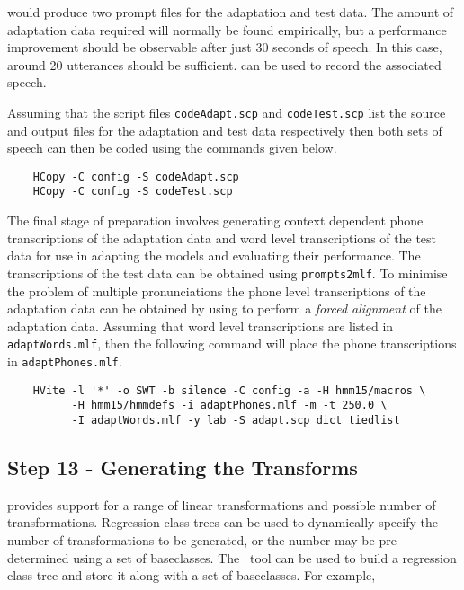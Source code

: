 \noindent
would produce two prompt files for the adaptation and test data. The amount of 
adaptation data required will normally be found empirically, but a performance 
improvement should be observable after just 30 seconds of speech.
In this case, around 20 utterances should be sufficient.
 can be used to record the associated speech.

Assuming that the script files \texttt{codeAdapt.scp} and \texttt{codeTest.scp} 
list the source and output files for the adaptation and test data respectively 
then both sets of speech can then be coded using the  commands given 
below.

\begin{verbatim}
    HCopy -C config -S codeAdapt.scp
    HCopy -C config -S codeTest.scp
\end{verbatim}

\noindent
The final stage of preparation involves generating context dependent phone 
transcriptions of the adaptation data and word level transcriptions of the test 
data for use in adapting the models and evaluating their performance.
The transcriptions of the test data can be obtained using \texttt{prompts2mlf}.
To minimise the problem of multiple pronunciations the phone level 
transcriptions of the adaptation data can be obtained by using 
to perform a \textit{forced alignment} of the adaptation data. Assuming 
that word level transcriptions are listed in \texttt{adaptWords.mlf}, then the
following command will place the phone transcriptions in 
\texttt{adaptPhones.mlf}.

\begin{verbatim}
    HVite -l '*' -o SWT -b silence -C config -a -H hmm15/macros \ 
          -H hmm15/hmmdefs -i adaptPhones.mlf -m -t 250.0 \ 
          -I adaptWords.mlf -y lab -S adapt.scp dict tiedlist
\end{verbatim}

\subsection{Step 13 - Generating the Transforms}
  provides
support for a range of linear transformations and possible number of
transformations. Regression class trees\index{adaptation!regression
tree} can be used to dynamically specify the number of transformations
to be generated, or the number may be pre-determined using a set of
baseclasses. The \HTK\ tool \htool{HHEd} can be used to build a
regression class tree and store it along with a set of baseclasses. For
example,

